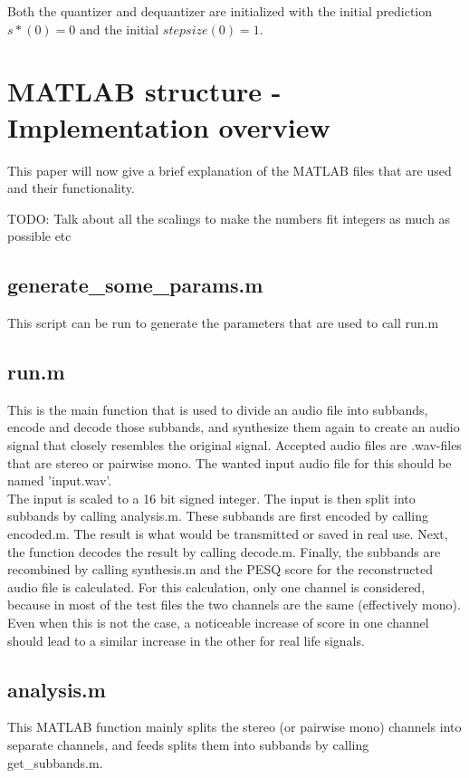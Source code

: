 \documentclass[a4paper]{article}
\begin{document}
Both the quantizer and dequantizer are initialized with the initial prediction $s*(0) = 0$ and the initial $stepsize(0) = 1$.

\section{MATLAB structure - Implementation overview}
This paper will now give a brief explanation of the MATLAB files that are used and their functionality.

TODO: Talk about all the scalings to make the numbers fit integers as much as possible etc

\subsection{generate\_some\_params.m}
This script can be run to generate the parameters that are used to call run.m

\subsection{run.m}
This is the main function that is used to divide an audio file into subbands, encode and decode those subbands, and synthesize them again to create an audio signal that closely resembles the original signal. Accepted audio files are .wav-files that are stereo or pairwise mono. The wanted input audio file for this should be named 'input.wav'.
\\
The input is scaled to a 16 bit signed integer. The input is then split into subbands by calling analysis.m. These subbands are first encoded by calling encoded.m. The result is what would be transmitted or saved in real use. Next, the function decodes the result by calling decode.m. Finally, the subbands are recombined by calling synthesis.m and the PESQ score for the reconstructed audio file is calculated. For this calculation, only one channel is considered, because in most of the test files the two channels are the same (effectively mono). Even when this is not the case, a noticeable increase of score in one channel should lead to a similar increase in the other for real life signals.

\subsection{analysis.m}
This MATLAB function mainly splits the stereo (or pairwise mono) channels into separate channels, and feeds splits them into subbands by calling get\_subbands.m.
\end{document}
